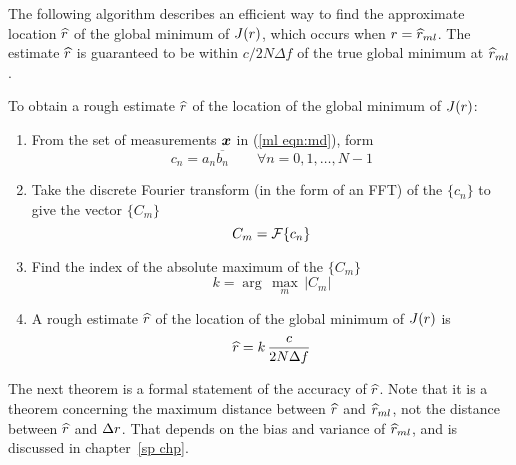 The following algorithm describes an efficient way to find the approximate
location $\widehat{r}$ of the global minimum of $J({r})$, which occurs when
${r}=\widehat{r}_{ml}$.  The estimate $\widehat{r}$ is guaranteed to be within
$c/2N\Delta f$ of the true global minimum at $\widehat{r}_{ml}$.

\begin{algorithm}
\label{ee alg:min using DFT}\mbox{}\par

To obtain a rough estimate $\widehat{r}$ of the location of the global minimum of 
$J({r})$:
\begin{enumerate}
\item From the set of measurements $\bm{x}$ in (\ref{ml eqn:md}), form 
\begin{equation}
c_n=a_n\overline{b_n}\qquad\forall n=0,1,\ldots, N-1
\end{equation}

\item Take the discrete Fourier transform (in the form of an FFT) of 
the $\{c_n\}$ to give the vector $\{C_m\}$
\begin{equation}
C_m={\cal F}\{c_n\}
\end{equation}

\item Find the index of the absolute maximum of the $\{C_m\}$
\begin{equation}
k=\arg\,\max_m\,\left|C_m\right|
\end{equation}

\item A rough estimate $\widehat{r}$ of the location of the global minimum of
$J({r})$ is
\begin{equation}
\widehat{r}=k\,\frac{c}{2N\Delta f}
\end{equation}
\end{enumerate}
\end{algorithm}

The next theorem is a formal statement of the accuracy of $\widehat{r}$.  
Note that it is a theorem concerning the maximum distance between $\widehat{r}$ and
$\widehat{r}_{ml}$, not the distance between $\widehat{r}$ and ${\Delta r}$.  That depends on the bias
and variance of $\widehat{r}_{ml}$, and is discussed in chapter~\ref{sp chp}.


